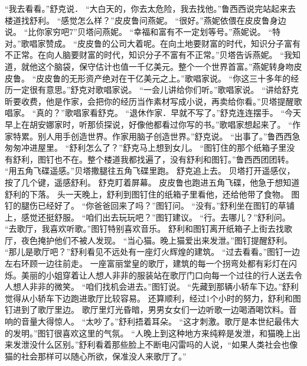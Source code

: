 \documentclass[a4paper,12pt,UTF8,twoside]{ctexbook}
\begin{document}
        “我去看看。”舒克说． 
        “大白天的，你去太危险，我去找他。”鲁西西说完站起来去楼道找舒利。 
        “感觉怎么样？”皮皮鲁问燕妮。 
        “很好。”燕妮依偎在皮皮鲁身边说。 
        “比你家穷吧7”贝塔问燕妮。 
        “幸福和富有不一定划等号。”燕妮说。 
        “特对。”歌唱家赞成。 
        “皮皮鲁的公司大着呢。在向土地要财富的时代，知识分子富有不正常。在向人脑要财富的时代，知识分子不富有不正常。”贝塔告诉燕妮。 
        “我知道，就他这个脑袋，保守估计也值一千亿美元。整个一个世界首富。”燕妮转身吻皮皮鲁。 
        “皮皮鲁的无形资产绝对在干亿美元之上。”歌唱家说。 
        “你这三十多年的经历一定很有意思。”舒克对歌唱家说。 
        “一会儿讲给你们听。”歌唱家说。 
        “讲给舒克昕要收费，他是作家，会把你的经历当作素材写成小说，再卖给你看。”贝塔提醒歌唱家。 
        “真的？”歌唱家看舒克。 
        “退休作家．早就不写了。”舒克连连摆手。 
        “今天早上在胡安娜家时，听那侦探说，好像他都看过你写的书。”歌唱家想起来了。 
        “作家特累。别人用手创造世界。作家用脑子创造世界。”舒克说。 
        “出事了。”鲁西西急匆匆冲进屋里。 
        “舒利怎么了？”舒克马上想到女儿。 
        “图钉住的那个纸箱子里没有舒利，图钉也不在。整个楼道我都找遍了，没有舒利和图钉。”鲁西西团团转。 
        “用五角飞碟遥感。”贝塔撒腿往五角飞碟里跑。 
        舒克追上去。 
        贝塔打开遥感仪，按了几个键，遥感舒利。 
        舒克盯着屏幕。 
        皮皮鲁也跑进五角飞碟，他急于想知道舒利的下落。 
        头一天晚上，舒利到图钉住的纸箱子里看他，还给他带了食物。 
        图钉的腿伤已经好了。 
        “你爸爸回来了吗？”图钉问。 
        “没有。”舒利坐在图钉的草铺上，感觉还挺舒服。 
        “咱们出去玩玩吧？”图钉建议。 
        “行。去哪儿？”舒利问。 
        “去歌厅，我喜欢听歌。”图钉特别喜欢音乐。 
        舒利和图钉离开纸箱子上街去找歌厅，夜色掩护他们不被人发现。 
        “当心猫。晚上猫爱出来发泄。”图钉提醒舒利。 
        “那儿是歌厅吧？”舒利看见不远处有一座灯火辉煌的建筑。 
        “过去看看。”图钉一边左右环顾一边往前走。 
        一座富丽堂皇的歌厅，建筑的每一个拐弯处都有彩灯在闪烁。美丽的小姐穿着让人想人非非的服装站在歌厅门口向每一个过往的行人送去令人想人非非的微笑。 
        “咱们找机会进去。”图钉说。 
        “先藏到那辆小轿车下边。”舒利觉得从小轿车下边跑进歌厅比较容易。 
        还算顺利，经过1个小时的努力，舒利和图钉进到了歌厅里边。 
        歌厅里灯光昏暗，男男女女们一边听歌一边喝酒喝饮料。音响的音量大得惊人。 
        “太吵了。”舒利捂着耳朵。 
        “这才刺激。歌厅是本世纪最伟大的发明。”图钉很喜欢这里的气氛。 
        “人晚上到这种地方来纯粹是发泄，和猫晚上出来发泄没什么区别。”舒利看着那些脸上不断电闪雷吗的人说，“如果人类社会也像猫的社会那样可以随心所欲，保准没人来歌厅了。” 
\end{document}
